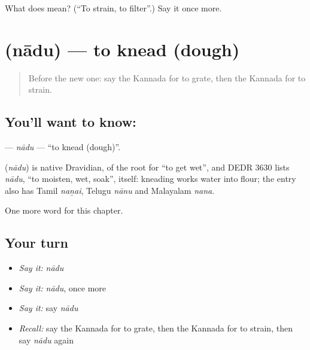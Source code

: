 \begin{tcolorbox}[breakable,colback=teal!4,colframe=teal!35!black,title={Before you move on}]
What does  mean? (\textquotedblleft{}To strain, to filter\textquotedblright{}.) Say it once more.
\end{tcolorbox}
\section[\texorpdfstring{\kn{ನಾದು} (nādu)}{ನಾದು (nādu)}]{ (nādu) — to knead (dough)}

\label{lesson:KA-C205-nadu}



\begin{quote}
Before the new one: say the Kannada for to grate, then the Kannada for to strain.
\end{quote}

\subsection*{You'll want to know: }
\textbf{} — \emph{nādu} — \textquotedblleft{}to knead (dough)\textquotedblright{}.

\begin{cousinweb}
\textbf{} (\emph{nādu}) is native Dravidian, of the root for \textquotedblleft{}to get wet\textquotedblright{}, and DEDR 3630 lists \emph{nādu}, \textquotedblleft{}to moisten, wet, soak\textquotedblright{}, itself: kneading works water into flour; the entry also has Tamil \emph{naṉai}, Telugu \emph{nānu} and Malayalam \emph{nana}.
\end{cousinweb}

\begin{grammarlens}[title={What you've built}]
One more word for this chapter.
\end{grammarlens}

\subsection*{Your turn}
\begin{itemize}
\raggedright
  \item \emph{Say it:} \emph{nādu}
  \item \emph{Say it:} \emph{nādu}, once more
  \item \emph{Say it:} say \emph{nādu}
  \item \emph{Recall:} say the Kannada for to grate, then the Kannada for to strain, then say \emph{nādu} again
\end{itemize}

